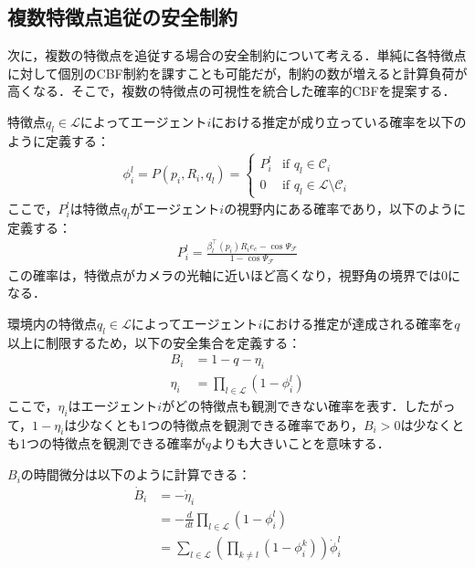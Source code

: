 \subsection{複数特徴点追従の安全制約}

次に，複数の特徴点を追従する場合の安全制約について考える．単純に各特徴点に対して個別のCBF制約を課すことも可能だが，制約の数が増えると計算負荷が高くなる．そこで，複数の特徴点の可視性を統合した確率的CBFを提案する．

特徴点$q_l \in \mathcal{L}$によってエージェント$i$における推定が成り立っている確率を以下のように定義する：
\begin{equation}
\begin{aligned}
\phi_i^l = P(p_i, R_i, q_l) = 
\begin{cases}
P_i^l & \text{if } q_l \in \mathcal{C}_i \\
0 & \text{if } q_l \in \mathcal{L} \setminus \mathcal{C}_i
\end{cases}
\label{eq:multi_probability}
\end{aligned}
\end{equation}
ここで，$P_i^l$は特徴点$q_l$がエージェント$i$の視野内にある確率であり，以下のように定義する：
\begin{equation}
\begin{aligned}
P_i^l = \frac{\beta_l^\top(p_i) R_i e_c - \cos\Psi_\mathcal{F}}{1 - \cos\Psi_\mathcal{F}}
\label{eq:visibility_probability}
\end{aligned}
\end{equation}
この確率は，特徴点がカメラの光軸に近いほど高くなり，視野角の境界では0になる．

環境内の特徴点$q_l \in \mathcal{L}$によってエージェント$i$における推定が達成される確率を$q$以上に制限するため，以下の安全集合を定義する：
\begin{equation}
\begin{aligned}
B_i &= 1 - q - \eta_i \\
\eta_i &= \prod_{l \in \mathcal{L}} (1 - \phi_i^l)
\label{eq:multi_safe_set}
\end{aligned}
\end{equation}
ここで，$\eta_i$はエージェント$i$がどの特徴点も観測できない確率を表す．したがって，$1 - \eta_i$は少なくとも1つの特徴点を観測できる確率であり，$B_i > 0$は少なくとも1つの特徴点を観測できる確率が$q$よりも大きいことを意味する．

$B_i$の時間微分は以下のように計算できる：
\begin{equation}
\begin{aligned}
\dot{B}_i &= -\dot{\eta}_i \\
&= -\frac{d}{dt}\prod_{l \in \mathcal{L}}(1 - \phi_i^l) \\
&= \sum_{l \in \mathcal{L}}\left(\prod_{k \neq l}(1 - \phi_i^k)\right)\dot{\phi}_i^l
\label{eq:multi_cbf_derivative}
\end{aligned}
\end{equation}

